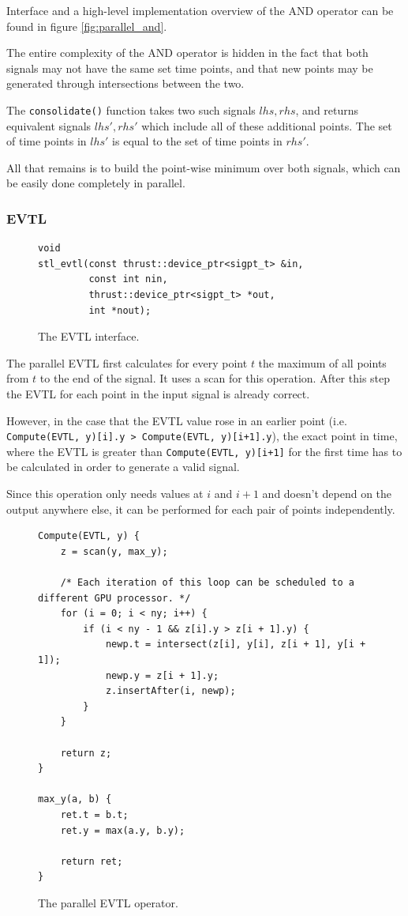 \documentclass[a4paper,10pt]{article}
\begin{document}
Interface and a high-level implementation overview of the AND operator can be found 
in figure \ref{fig:parallel_and}.

The entire complexity of the AND operator is hidden in the fact that
both signals may not have the same set time points, and that new points
may be generated through intersections between the two.

The \lstinline|consolidate()|
function takes two such signals $lhs, rhs$, and returns equivalent signals $lhs', rhs'$ which include
all of these additional points. The set of time points in $lhs'$ is equal to the set
of time points in $rhs'$.

All that remains is to build the point-wise minimum over both signals, which
can be easily done completely in parallel.

\subsubsection{EVTL}

\begin{figure}[H]
\begin{lstlisting}
void
stl_evtl(const thrust::device_ptr<sigpt_t> &in,
         const int nin,
         thrust::device_ptr<sigpt_t> *out,
         int *nout);
\end{lstlisting}
\caption{
\label{fig:parallel_evtl}
The EVTL interface.}
\end{figure}

The parallel EVTL first calculates for every point $t$ the maximum of all points from
$t$ to the end of the signal. It uses a scan for this operation. After this step the
EVTL for each point in the input signal is already correct.

However, in the case that the EVTL value rose in an earlier point (i.e.
\lstinline|Compute(EVTL, y)[i].y > Compute(EVTL, y)[i+1].y|), the exact point in time,
where the EVTL is greater than \lstinline|Compute(EVTL, y)[i+1]| for the first time
has to be calculated in order to generate a valid signal.

Since this operation only needs values at $i$ and $i + 1$ and doesn't depend on the
output anywhere else, it can be performed for each pair of points independently.

\begin{figure}[H]
\begin{lstlisting}
Compute(EVTL, y) {
    z = scan(y, max_y);

    /* Each iteration of this loop can be scheduled to a different GPU processor. */
    for (i = 0; i < ny; i++) {
        if (i < ny - 1 && z[i].y > z[i + 1].y) {
            newp.t = intersect(z[i], y[i], z[i + 1], y[i + 1]);
            newp.y = z[i + 1].y;
            z.insertAfter(i, newp);
        }
    }

    return z;
}

max_y(a, b) {
    ret.t = b.t;
    ret.y = max(a.y, b.y);

    return ret;
}
\end{lstlisting}
\label{fig:par_evtl}
\caption{The parallel EVTL operator.}
\end{figure}
\end{document}
